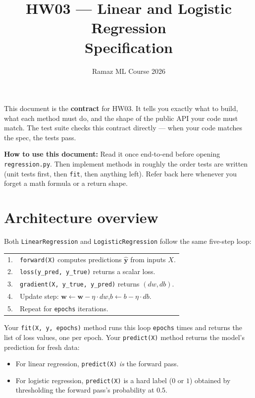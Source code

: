 \documentclass[11pt]{article}
\title{HW03 — Linear and Logistic Regression\\\large Specification}
\author{Ramaz ML Course 2026}
\date{}
\newcommand{\code}[1]{\texttt{\small #1}}
\newcommand{\vw}{\mathbf{w}}
\newcommand{\vyhat}{\hat{\mathbf{y}}}
\begin{document}
\maketitle

\noindent
This document is the \textbf{contract} for HW03. It tells you exactly what to build,
what each method must do, and the shape of the public API your code must match.
The test suite checks this contract directly --- when your code matches the spec,
the tests pass.

\medskip
\noindent
\textbf{How to use this document:} Read it once end-to-end before opening
\code{regression.py}. Then implement methods in roughly the order tests are written
(unit tests first, then \code{fit}, then anything left). Refer back here whenever
you forget a math formula or a return shape.

\tableofcontents

\section{Architecture overview}

Both \code{LinearRegression} and \code{LogisticRegression} follow the same five-step loop:

\begin{center}
\begin{tabular}{ll}
1. & \code{forward(X)} computes predictions $\vyhat$ from inputs $X$. \\
2. & \code{loss(y\_pred, y\_true)} returns a scalar loss. \\
3. & \code{gradient(X, y\_true, y\_pred)} returns $(dw, db)$. \\
4. & Update step: $\vw \leftarrow \vw - \eta \cdot dw$,\quad $b \leftarrow b - \eta \cdot db$. \\
5. & Repeat for \code{epochs} iterations.
\end{tabular}
\end{center}

\noindent
Your \code{fit(X, y, epochs)} method runs this loop \code{epochs} times and returns
the list of loss values, one per epoch. Your \code{predict(X)} method returns the
model's prediction for fresh data:

\begin{itemize}
    \item For linear regression, \code{predict(X)} \emph{is} the forward pass.
    \item For logistic regression, \code{predict(X)} is a hard label ($0$ or $1$)
          obtained by thresholding the forward pass's probability at $0.5$.
\end{itemize}
\end{document}
